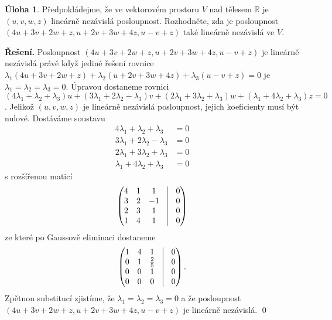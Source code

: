 \documentclass{article}
\theoremstyle{definition}
\newtheorem{uloha}{Úloha}
\theoremstyle{plain}
\newcommand{\R}{\mathbb{R}}
\newenvironment{reseni}{\noindent\textbf{Řešení.}\hspace{0.5em}}{\hfill\qed\medskip}
\begin{document}
\begin{uloha}
Předpokládejme, že ve vektorovém prostoru $V$ nad tělesem $\R$ je $(u, v, w, z)$ lineárně nezávislá
posloupnost. Rozhodněte, zda je posloupnost $(4u + 3v + 2w + z, u + 2v + 3w + 4z, u - v + z)$ také
lineárně nezávislá ve $V$.
\end{uloha}
\begin{reseni}
Posloupnost $(4u + 3v + 2w + z, u + 2v + 3w + 4z, u - v + z)$ je lineárně nezávislá právě když jediné řešení rovnice
$\lambda_1(4u + 3v + 2w + z) + \lambda_2(u + 2v + 3w + 4z) + \lambda_3(u - v + z) = 0$ je $\lambda_1 = \lambda_2 = \lambda_3 = 0$.
Úpravou dostaneme rovnici $(4\lambda_1 + \lambda_2 + \lambda_3)u + (3\lambda_1 + 2\lambda_2 - \lambda_3)v + (2\lambda_1 + 3\lambda_2 + \lambda_3)w + (\lambda_1 + 4\lambda_2 + \lambda_3)z = 0$.
Jelikož $(u, v, w, z)$ je lineárně nezávislá posloupnost, jejich koeficienty musí být nulové. Dostáváme soustavu
\begin{align*}
4\lambda_1 + \lambda_2 + \lambda_3 &= 0 \\
3\lambda_1 + 2\lambda_2 - \lambda_3 &= 0 \\
2\lambda_1 + 3\lambda_2 + \lambda_3 &= 0 \\
\lambda_1 + 4\lambda_2 + \lambda_3 &= 0
\end{align*}
s rozšířenou maticí
\begin{align*}
\begin{pmatrix}
4 & 1 & 1 & \vline & 0 \\
3 & 2 & -1 & \vline & 0 \\
2 & 3 & 1 & \vline & 0 \\
1 & 4 & 1 & \vline & 0
\end{pmatrix}
\end{align*}
ze které po Gaussově eliminaci dostaneme
\begin{align*}
\begin{pmatrix}
1 & 4 & 1 & \vline & 0 \\
0 & 1 & \frac{2}{5} & \vline & 0 \\
0 & 0 & 1 & \vline & 0 \\
0 & 0 & 0 & \vline & 0
\end{pmatrix}.
\end{align*}
Zpětnou substitucí zjistíme, že $\lambda_1 = \lambda_2 = \lambda_3 = 0$ a že posloupnost $(4u + 3v + 2w + z, u + 2v + 3w + 4z, u - v + z)$ je lineárně nezávislá.
\end{reseni}
\end{document}
